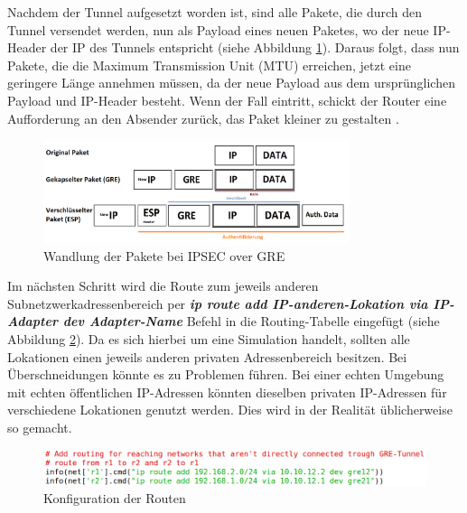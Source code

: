 \documentclass[fontsize=12pt,paper=a4,open=any,parskip=half,
  twoside=false,toc=listof,toc=bibliography,fleqn,leqno,
  captions=nooneline,captions=tableabove,british]{scrbook}
\begin{document}
Nachdem der Tunnel aufgesetzt worden ist, sind alle Pakete, die durch den Tunnel versendet werden, nun als Payload eines neuen Paketes, wo der neue IP-Header der IP des Tunnels entspricht \cite{newpayload} (siehe Abbildung \ref{ipsecgre}). Daraus folgt, dass nun Pakete, die die Maximum Transmission Unit (MTU) erreichen, jetzt eine geringere Länge annehmen müssen, da der neue Payload aus dem ursprünglichen Payload und IP-Header besteht. Wenn der Fall eintritt, schickt der Router eine Aufforderung an den Absender zurück, das Paket kleiner zu gestalten \cite{MTU}.

\begin{figure}[H]
	\centering
	\includegraphics[width=0.8\textwidth]{Bilder/ipsecgre}
	\captionsetup{justification=centering,margin=2cm}
	\caption{Wandlung der Pakete bei IPSEC over GRE}
	\label{ipsecgre}
\end{figure}

Im nächsten Schritt wird die Route zum jeweils anderen Subnetzwerkadressenbereich per \textit{\textbf{ip route add IP-anderen-Lokation via IP-Adapter dev Adapter-Name}} Befehl in die Routing-Tabelle eingefügt \cite{addroute} (siehe Abbildung \ref{route}). Da es sich hierbei um eine Simulation handelt, sollten alle Lokationen einen jeweils anderen privaten Adressenbereich besitzen. Bei Überschneidungen könnte es zu Problemen führen. Bei einer echten Umgebung mit echten öffentlichen IP-Adressen könnten dieselben privaten IP-Adressen für verschiedene Lokationen genutzt werden. Dies wird in der Realität üblicherweise so gemacht.

\begin{figure}[H]
 \centering
 \includegraphics[width=1.0\textwidth]{Bilder/route}
 \captionsetup{justification=centering,margin=2cm}
 \caption{Konfiguration der Routen}
 \label{route}
\end{figure}
\end{document}
